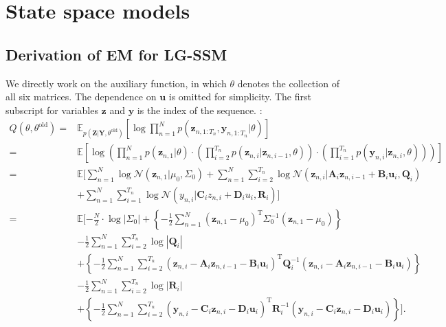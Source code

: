 \documentclass[UTF8]{ctexart}
\begin{document}
\newpage
\section{State space models}
\subsection{Derivation of EM for LG-SSM}
We directly work on the auxiliary function, in which $\theta$ denotes the collection of all six matrices.
The dependence on $\textbf{u}$ is omitted for simplicity.
The first subscript for variables $\textbf{z}$ and $\textbf{y}$ is the index of the sequence.
:
\begin{align}
Q(\theta,\theta^{\text{old}})=&\mathbb{E}_{p(\textbf{Z}|\textbf{Y},\theta^{\text{old}})}[\log \prod_{n=1}^{N}p(\textbf{z}_{n,1:T_{n}},\textbf{y}_{n,1:T_{n}}|\theta)]\nonumber \\
=&\mathbb{E}\left[\log\left(\prod_{n=1}^{N}p(\textbf{z}_{n,1}|\theta)\cdot\left(\prod_{i=2}^{T_{n}}p(\textbf{z}_{n,i}|\textbf{z}_{n,i-1},\theta)\right)\cdot\left(\prod_{i=1}^{T_{n}}p(\textbf{y}_{n,i}|\textbf{z}_{n,i},\theta)\right)\right)\right]\nonumber \\
=&\mathbb{E}[\sum_{n=1}^{N}\log \mathcal{N}(\textbf{z}_{n,1}|\mu_{0},\Sigma_{0})+\sum_{n=1}^{N}\sum_{i=2}^{T_{n}}\log \mathcal{N}(\textbf{z}_{n,i}|\textbf{A}_{i}\textbf{z}_{n,i-1}+\textbf{B}_{i}\textbf{u}_{i},\textbf{Q}_{i}) \nonumber \\
\ &+\sum_{n=1}^{N}\sum_{i=1}^{T_{n}}\log\mathcal{N}(y_{n,i}|\textbf{C}_{i}z_{n,i}+\textbf{D}_{i}u_{i},\textbf{R}_{i})]\nonumber \\
=&\mathbb{E}[-\frac{N}{2}\cdot\log |\Sigma_{0}|+\left\{-\frac{1}{2}\sum_{n=1}^{N}(\textbf{z}_{n,1}-\mu_{0})^{\text{T}}\Sigma_{0}^{-1}(\textbf{z}_{n,1}-\mu_{0}) \right\} \nonumber \\
\ &-\frac{1}{2}\sum_{n=1}^{N}\sum_{i=2}^{T_{n}}\log |\textbf{Q}_{i}|\nonumber \\
\ &+\left\{-\frac{1}{2}\sum_{n=1}^{N}\sum_{i=2}^{T_{n}}(\textbf{z}_{n,i}-\textbf{A}_{i}\textbf{z}_{n,i-1}-\textbf{B}_{i}\textbf{u}_{i})^{\text{T}}\textbf{Q}_{i}^{-1} (\textbf{z}_{n,i}-\textbf{A}_{i}\textbf{z}_{n,i-1}-\textbf{B}_{i}\textbf{u}_{i}) \right\}  \nonumber \\
\ &-\frac{1}{2}\sum_{n=1}^{N}\sum_{i=2}^{T_{n}}\log |\textbf{R}_{i}|\nonumber \\
\ &+\left\{-\frac{1}{2}\sum_{n=1}^{N}\sum_{i=2}^{T_{n}}(\textbf{y}_{n,i}-\textbf{C}_{i}\textbf{z}_{n,i}-\textbf{D}_{i}\textbf{u}_{i})^{\text{T}}\textbf{R}_{i}^{-1} (\textbf{y}_{n,i}-\textbf{C}_{i}\textbf{z}_{n,i}-\textbf{D}_{i}\textbf{u}_{i})\right\}   ].\nonumber
\end{align}
\end{document}
